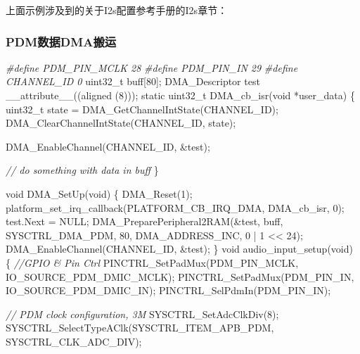 \documentclass[
  12pt,
]{book}
\newenvironment{Shaded}{\begin{snugshade}}{\end{snugshade}}
\newcommand{\CommentTok}[1]{\textcolor[rgb]{0.56,0.35,0.01}{\textit{#1}}}
\newcommand{\DataTypeTok}[1]{\textcolor[rgb]{0.13,0.29,0.53}{#1}}
\newcommand{\DecValTok}[1]{\textcolor[rgb]{0.00,0.00,0.81}{#1}}
\newcommand{\NormalTok}[1]{#1}
\newcommand{\PreprocessorTok}[1]{\textcolor[rgb]{0.56,0.35,0.01}{\textit{#1}}}
\begin{document}
上面示例涉及到的关于I2s配置参考手册的I2s章节：

\hypertarget{pdmux6570ux636edmaux642cux8fd0}{%
\subsubsection{PDM数据DMA搬运}\label{pdmux6570ux636edmaux642cux8fd0}}

\begin{Shaded}
\begin{Highlighting}[]
\PreprocessorTok{#define PDM_PIN_MCLK        28}
\PreprocessorTok{#define PDM_PIN_IN          29}
\PreprocessorTok{#define CHANNEL_ID          0}
\DataTypeTok{uint32_t}\NormalTok{ buff[}\DecValTok{80}\NormalTok{];}
\NormalTok{DMA_Descriptor test __attribute__((aligned (}\DecValTok{8}\NormalTok{)));}
\DataTypeTok{static} \DataTypeTok{uint32_t}\NormalTok{ DMA_cb_isr(}\DataTypeTok{void}\NormalTok{ *user_data)}
\NormalTok{\{ }
    \DataTypeTok{uint32_t}\NormalTok{ state = DMA_GetChannelIntState(CHANNEL_ID);}
\NormalTok{    DMA_ClearChannelIntState(CHANNEL_ID, state);}

\NormalTok{    DMA_EnableChannel(CHANNEL_ID, &test);}

    \CommentTok{// do something with data in buff}
\NormalTok{\}}

\DataTypeTok{void}\NormalTok{ DMA_SetUp(}\DataTypeTok{void}\NormalTok{)}
\NormalTok{\{}
\NormalTok{    DMA_Reset(}\DecValTok{1}\NormalTok{);}
\NormalTok{    platform_set_irq_callback(PLATFORM_CB_IRQ_DMA, DMA_cb_isr, }\DecValTok{0}\NormalTok{);}
\NormalTok{    test.Next = NULL;}
\NormalTok{    DMA_PreparePeripheral2RAM(&test, }
\NormalTok{                              buff, }
\NormalTok{                              SYSCTRL_DMA_PDM, }
                              \DecValTok{80}\NormalTok{, }
\NormalTok{                              DMA_ADDRESS_INC, }
                              \DecValTok{0}\NormalTok{ | }\DecValTok{1}\NormalTok{ << }\DecValTok{24}\NormalTok{);}
\NormalTok{    DMA_EnableChannel(CHANNEL_ID, &test);}
\NormalTok{\}}
\DataTypeTok{void}\NormalTok{ audio_input_setup(}\DataTypeTok{void}\NormalTok{)}
\NormalTok{\{}
    \CommentTok{//GPIO & Pin Ctrl}
\NormalTok{    PINCTRL_SetPadMux(PDM_PIN_MCLK, IO_SOURCE_PDM_DMIC_MCLK);}
\NormalTok{    PINCTRL_SetPadMux(PDM_PIN_IN, IO_SOURCE_PDM_DMIC_IN);}
\NormalTok{    PINCTRL_SelPdmIn(PDM_PIN_IN);}

    \CommentTok{// PDM clock configuration, 3M}
\NormalTok{    SYSCTRL_SetAdcClkDiv(}\DecValTok{8}\NormalTok{);}
\NormalTok{    SYSCTRL_SelectTypeAClk(SYSCTRL_ITEM_APB_PDM, SYSCTRL_CLK_ADC_DIV);}
    

\end{Highlighting}
\end{Shaded}
\end{document}
